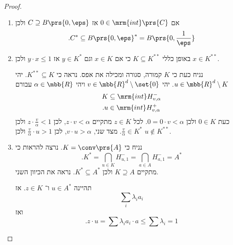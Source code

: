 \documentclass[a4paper,10pt,twoside,openany]{book}
\begin{document}
\begin{proof}
\begin{enumerate}
\item%
אם
$0 \in \mrm{int}\prs{C}$
אז
$C \supseteq B\prs{0,\eps}$
ולכן
\begin{align*}
\text{.} C^* \subseteq B\prs{0,\eps}^* = B\prs{0,\frac{1}{\eps}}
\end{align*}
\item%
באופן כללי
$K \subseteq K^{**}$
כי אם
$x \in K$
וגם
$y \in K^*$
אז
$y \cdot x \leq 1$
ולכן
$x \in K^{**}$.

נניח כעת כי
$K$
קמורה, סגורה ומכילה את אפס. נראה כי
$K^{**} \subseteq K$.
יהי
$u \in \mbb{R}^d \setminus K$.
יהי
$v \in \mbb{R}^d \setminus \set{0}$
ויהי
$\alpha \in \mbb{R}$
עבורם
\begin{align*}
K &\subseteq \mrm{int} H_{v,\alpha}^- \\
\text{.} u &\in \mrm{int} H_{v,\alpha}^+ 
\end{align*}
כעת
$0 \in K$
ולכן
$0 = 0 \cdot v < \alpha$.
לכל
$z \in K$
מתקיים
$z \cdot v < \alpha$,
לכן
$z \cdot \frac{v}{\alpha} < 1$
ולכן
$\frac{v}{\alpha} \in K^*$.
מצד שני,
$v \cdot u > \alpha$,
לכן
$\frac{v}{\alpha} \cdot u > 1$
ולכן
$u \notin K^{**}$.

\item%
נניח כי
$K = \conv\prs{A}$.
נרצה להראות כי
\[\text{.} K^* = \bigcap_{u \in K} H_{u,1}^- = \bigcap_{a \in A} H_{a,1}^- = A^*\]
מתקיים
$K \supseteq A$
ולכן
$K^* \subseteq A^*$.
נראה את הכיוון השני.

תהיינה
$u \in A^*$
ו־%
$z \in K$.
אז
\[\sum_i \lambda_i a_i\]
ואז
\[\text{.} z \cdot u = \sum \lambda_i a_i \cdot a \leq \sum \lambda_i = 1\]
\end{enumerate}
\end{proof}
\end{document}
